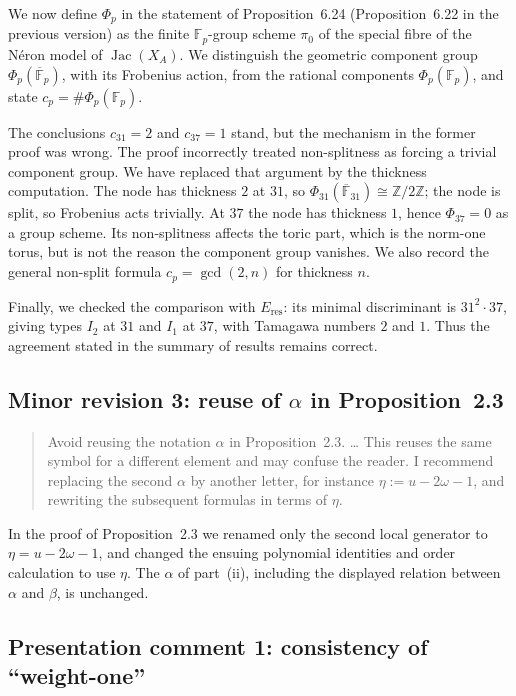 \documentclass[11pt,letterpaper]{article}
\newcommand{\ZZ}{\mathbb{Z}}
\newcommand{\Jac}{\operatorname{Jac}}
\begin{document}
We now define \(\Phi_p\) in the statement of Proposition~6.24 (Proposition~6.22 in the previous version) as the finite \(\mathbb F_p\)-group scheme \(\pi_0\) of the special fibre of the N\'eron model of \(\Jac(X_A)\). We distinguish the geometric component group \(\Phi_p(\overline{\mathbb F}_p)\), with its Frobenius action, from the rational components \(\Phi_p(\mathbb F_p)\), and state \(c_p=\#\Phi_p(\mathbb F_p)\).

The conclusions \(c_{31}=2\) and \(c_{37}=1\) stand, but the mechanism in the former proof was wrong. The proof incorrectly treated non-splitness as forcing a trivial component group. We have replaced that argument by the thickness computation. The node has thickness \(2\) at \(31\), so \(\Phi_{31}(\overline{\mathbb F}_{31})\cong\ZZ/2\ZZ\); the node is split, so Frobenius acts trivially. At \(37\) the node has thickness \(1\), hence \(\Phi_{37}=0\) as a group scheme. Its non-splitness affects the toric part, which is the norm-one torus, but is not the reason the component group vanishes. We also record the general non-split formula \(c_p=\gcd(2,n)\) for thickness \(n\).

Finally, we checked the comparison with \(E_{\mathrm{res}}\): its minimal discriminant is \(31^2\cdot37\), giving types \(I_2\) at \(31\) and \(I_1\) at \(37\), with Tamagawa numbers \(2\) and \(1\). Thus the agreement stated in the summary of results remains correct.

\subsection*{Minor revision 3: reuse of \(\alpha\) in Proposition~2.3}

\begin{quote}
Avoid reusing the notation \(\alpha\) in Proposition~2.3. \dots{} This reuses the same symbol for a different element and may confuse the reader. I recommend replacing the second \(\alpha\) by another letter, for instance \(\eta:=u-2\omega-1\), and rewriting the subsequent formulas in terms of \(\eta\).
\end{quote}

In the proof of Proposition~2.3 we renamed only the second local generator to \(\eta=u-2\omega-1\), and changed the ensuing polynomial identities and order calculation to use \(\eta\). The \(\alpha\) of part~(ii), including the displayed relation between \(\alpha\) and \(\beta\), is unchanged.

\subsection*{Presentation comment 1: consistency of ``weight-one''}
\end{document}

